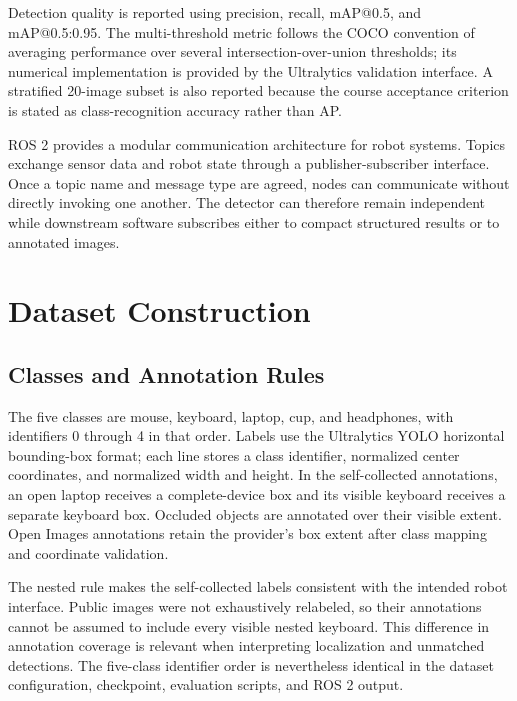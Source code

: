 \documentclass[12pt,a4paper]{article}
\makeatletter
\newcommand{\mAPfifty}{mAP@0.5}
\newcommand{\mAPcoco}{mAP@0.5:0.95}
\makeatother
\begin{document}
Detection quality is reported using precision, recall, \mAPfifty{}, and \mAPcoco{}. The multi-threshold metric follows the COCO convention of averaging performance over several intersection-over-union thresholds\cite{lin2014coco}; its numerical implementation is provided by the Ultralytics validation interface\cite{ultralyticsval}. A stratified 20-image subset is also reported because the course acceptance criterion is stated as class-recognition accuracy rather than AP.

ROS 2 provides a modular communication architecture for robot systems\cite{macenski2022ros2}. Topics exchange sensor data and robot state through a publisher-subscriber interface. Once a topic name and message type are agreed, nodes can communicate without directly invoking one another\cite{ros2topics}. The detector can therefore remain independent while downstream software subscribes either to compact structured results or to annotated images.

\section{Dataset Construction}

\subsection{Classes and Annotation Rules}

The five classes are mouse, keyboard, laptop, cup, and headphones, with identifiers 0 through 4 in that order. Labels use the Ultralytics YOLO horizontal bounding-box format; each line stores a class identifier, normalized center coordinates, and normalized width and height\cite{ultralyticsdataset}. In the self-collected annotations, an open laptop receives a complete-device box and its visible keyboard receives a separate keyboard box. Occluded objects are annotated over their visible extent. Open Images annotations retain the provider's box extent after class mapping and coordinate validation.

The nested rule makes the self-collected labels consistent with the intended robot interface. Public images were not exhaustively relabeled, so their annotations cannot be assumed to include every visible nested keyboard. This difference in annotation coverage is relevant when interpreting localization and unmatched detections. The five-class identifier order is nevertheless identical in the dataset configuration, checkpoint, evaluation scripts, and ROS 2 output.
\end{document}
